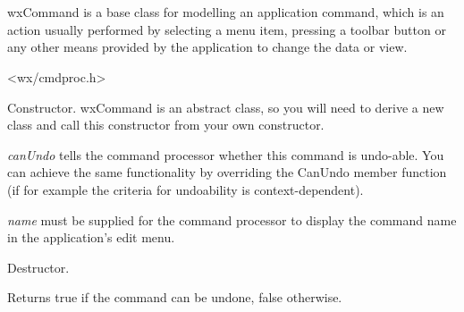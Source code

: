 \section{}\label{wxcommand}

wxCommand is a base class for modelling an application command,
which is an action usually performed by selecting a menu item, pressing
a toolbar button or any other means provided by the application to
change the data or view.




<wx/cmdproc.h>






\label{wxcommandctor}


Constructor. wxCommand is an abstract class, so you will need to derive
a new class and call this constructor from your own constructor.

{\it canUndo} tells the command processor whether this command is undo-able. You
can achieve the same functionality by overriding the CanUndo member function (if for example
the criteria for undoability is context-dependent).

{\it name} must be supplied for the command processor to display the command name
in the application's edit menu.

\label{wxcommanddtor}


Destructor.

\label{wxcommandcanundo}


Returns true if the command can be undone, false otherwise.

\label{wxcommanddo}


